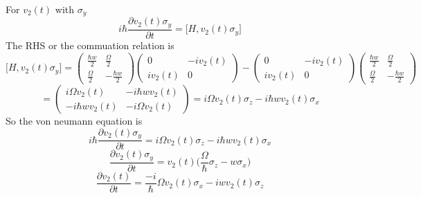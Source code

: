 \documentclass[12pt]{article}
\begin{document}
\begin{enumerate}
\begin{enumerate}
    For $v_2 (t)$ with $\sigma_y$ 
    $$ i \hbar \frac{\partial v_2 (t) \sigma_y}{\partial t} = \Big[H, v_2 (t) \sigma_y \Big] $$
    The RHS or the commuation relation is 
    $$ \Big[H, v_2 (t) \sigma_y \Big] = \left(\begin{array}{ccc} \frac{\hbar w}{2} & \frac{\Omega}{2} \\ \frac{\Omega}{2} & -\frac{\hbar w}{2} \end{array}\right) \left(\begin{array}{ccc} 0 & -iv_2 (t) \\ iv_2 (t) & 0 \end{array}\right)  - \left(\begin{array}{ccc} 0 & -iv_2 (t) \\ iv_2 (t) & 0 \end{array}\right) \left(\begin{array}{ccc} \frac{\hbar w}{2} & \frac{\Omega}{2} \\ \frac{\Omega}{2} & -\frac{\hbar w}{2} \end{array}\right) $$
    $$ =  \left(\begin{array}{ccc} i \Omega v_2 (t) & -i \hbar w v_2 (t)\\ -i \hbar w v_2 (t) & -i \Omega v_2 (t) \end{array}\right) = i \Omega v_2 (t) \sigma_z - i \hbar w v_2 (t) \sigma_x $$
    So the von neumann equation is 
    $$ i \hbar \frac{\partial v_2 (t) \sigma_y}{\partial t} = i \Omega v_2 (t) \sigma_z - i \hbar w v_2 (t) \sigma_x $$ 
    $$  \frac{\partial v_2 (t) \sigma_y}{\partial t} = v_2 (t) \Big( \frac{\Omega}{\hbar} \sigma_z - w \sigma_x \Big) $$ 
    $$ \frac{\partial v_2 (t)}{\partial t} = \frac{-i}{\hbar} \Omega v_2 (t) \sigma_x - iw v_2(t) \sigma_z $$


\end{enumerate}
\end{enumerate}
\end{document}
